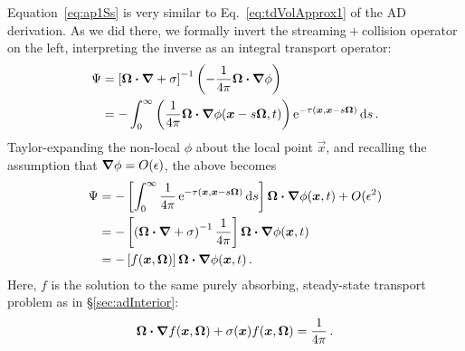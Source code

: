 Equation~\eqref{eq:ap1Ss} is very similar to Eq.~\eqref{eq:tdVolApprox1} of the
AD derivation. As we did there, we formally invert the streaming${}+{}$collision
operator on the left, interpreting the inverse as an integral transport
operator:
\begin{align*}
  \Psi
  &= \left[ \bm{\Omega}\bm{\cdot} \bm{\nabla} + \sigma \right]^{-1} \left(
  - \frac{1}{4\pi} \bm{\Omega}\bm{\cdot} \bm{\nabla} \phi \right)
  \\
  &= - \int_{0}^{\infty}
  \left( \frac{1}{4\pi} \bm{\Omega}\bm{\cdot} \bm{\nabla} \phi(\bm{x} - s \bm{\Omega},
  t)\right)
  \mathop{}\!\mathrm{e}^{ -\tau(\bm{x}, \bm{x} - s \bm{\Omega})}
  \mathop{}\!\mathrm{d} s \,.
\end{align*}
Taylor-expanding the non-local $\phi$ about the local point $\vec{x}$, and
recalling the assumption that $\bm{\nabla}\phi = O(\epsilon)$, the above becomes
\begin{align} \nonumber
\Psi
&= - \left[ \int_{0}^{\infty} \frac{1}{4\pi} 
    \mathop{}\!\mathrm{e}^{ -\tau(\bm{x}, \bm{x} - s \bm{\Omega})}
      \mathop{}\!\mathrm{d} s \right] \bm{\Omega}\bm{\cdot} \bm{\nabla}\phi(\bm{x}, t) + O(\epsilon^2)
\\ \nonumber
&= - 
  \left[\left(\bm{\Omega}\bm{\cdot} \bm{\nabla}  + \sigma \right)^{-1}
  \frac{1}{4\pi}\right] \bm{\Omega}\bm{\cdot} \bm{\nabla} \phi(\bm{x}, t)
\\ \label{eq:ap1capPsiApprox}
&= - \left[ f(\bm{x},\bm{\Omega}) \right] \bm{\Omega}\bm{\cdot} \bm{\nabla} \phi(\bm{x}, t)\,.
\end{align}
Here, $f$ is the solution to the same purely absorbing, steady-state transport
problem as in \S\ref{sec:adInterior}:
\begin{equation} \tagref{eq:fVol}
  \vec{\Omega}\vd \grad f(\vec{x}, \vec{\Omega})
  + \sigma(\vec{x}) f (\vec{x}, \vec{\Omega})
= \frac{1}{4\pi} \,.
\end{equation}

